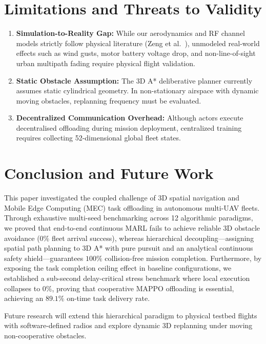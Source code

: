 \documentclass[conference]{IEEEtran}
\begin{document}
\section{Limitations and Threats to Validity}
\label{sec:limitations}

\begin{enumerate}
    \item \textbf{Simulation-to-Reality Gap:} While our aerodynamics and RF channel models strictly follow physical literature (Zeng et al.~\cite{zeng2019energy}), unmodeled real-world effects such as wind gusts, motor battery voltage drop, and non-line-of-sight urban multipath fading require physical flight validation.
    \item \textbf{Static Obstacle Assumption:} The 3D A* deliberative planner currently assumes static cylindrical geometry. In non-stationary airspace with dynamic moving obstacles, replanning frequency must be evaluated.
    \item \textbf{Decentralized Communication Overhead:} Although actors execute decentralised offloading during mission deployment, centralized training requires collecting 52-dimensional global fleet states.
\end{enumerate}

\section{Conclusion and Future Work}
\label{sec:conclusion}

This paper investigated the coupled challenge of 3D spatial navigation and Mobile Edge Computing (MEC) task offloading in autonomous multi-UAV fleets. Through exhaustive multi-seed benchmarking across 12 algorithmic paradigms, we proved that end-to-end continuous MARL fails to achieve reliable 3D obstacle avoidance ($0\%$ fleet arrival success), whereas hierarchical decoupling—assigning spatial path planning to 3D A* with pure pursuit and an analytical continuous safety shield—guarantees $100\%$ collision-free mission completion. Furthermore, by exposing the task completion ceiling effect in baseline configurations, we established a sub-second delay-critical stress benchmark where local execution collapses to $0\%$, proving that cooperative MAPPO offloading is essential, achieving an $89.1\%$ on-time task delivery rate.

Future research will extend this hierarchical paradigm to physical testbed flights with software-defined radios and explore dynamic 3D replanning under moving non-cooperative obstacles.

\balance


\end{document}
